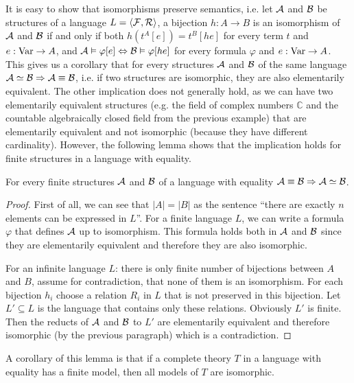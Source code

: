 It is easy to show that isomorphisms preserve semantics, i.e. let $\mathcal{A}$ and $\mathcal{B}$ be structures of a language $L = \langle \mathcal{F}, \mathcal{R} \rangle$, a bijection $h: A \to B$ is an isomorphism of $\mathcal{A}$ and $\mathcal{B}$ if and only if both $h(t^A[e])=t^B[he]$ for every term $t$ and $e: \operatorname{Var} \to A$, and $\mathcal{A} \vDash \varphi[e] \Leftrightarrow \mathcal{B} \vDash \varphi[he]$ for every formula $\varphi$ and $e: \operatorname{Var} \to A$. This gives us a corollary that for every structures $\mathcal{A}$ and $\mathcal{B}$ of the same language $\mathcal{A} \simeq \mathcal{B} \Rightarrow \mathcal{A} \equiv \mathcal{B}$, i.e. if two structures are isomorphic, they are also elementarily equivalent. The other implication does not generally hold, as we can have two elementarily equivalent structures (e.g. the field of complex numbers $\mathbb{C}$ and the countable algebraically closed field from the previous example) that are elementarily equivalent and not isomorphic (because they have different cardinality). However, the following lemma shows that the implication holds for finite structures in a language with equality.

\begin{lemma}
For every finite structures $\mathcal{A}$ and $\mathcal{B}$ of a language with equality $\mathcal{A} \equiv \mathcal{B} \Rightarrow \mathcal{A} \simeq \mathcal{B}$.
\end{lemma}
\begin{proof}
First of all, we can see that $|A| = |B|$ as the sentence ``there are exactly $n$ elements can be expressed in $L$''. For a finite language $L$, we can write a formula $\varphi$ that defines $\mathcal{A}$ up to isomorphism. This formula holds both in $\mathcal{A}$ and $\mathcal{B}$ since they are elementarily equivalent and therefore they are also isomorphic.

For an infinite language $L$: there is only finite number of bijections between $A$ and $B$, assume for contradiction, that none of them is an isomorphism. For each bijection $h_i$ choose a relation $R_i$ in $L$ that is not preserved in this bijection. Let $L' \subseteq L$ is the language that contains only these relations. Obviously $L'$ is finite. Then the reducts of $\mathcal{A}$ and $\mathcal{B}$ to $L'$ are elementarily equivalent and therefore isomorphic (by the previous paragraph) which is a contradiction.
\end{proof}

A corollary of this lemma is that if a complete theory $T$ in a language with equality has a finite model, then all models of $T$ are isomorphic.

